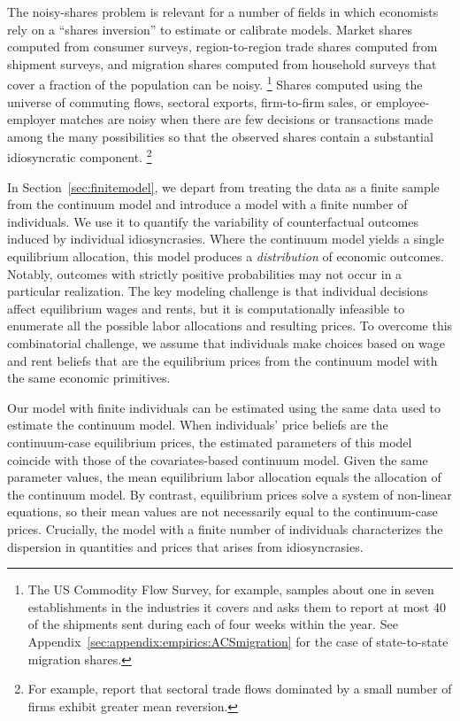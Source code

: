 \documentclass[11pt]{article}
\theoremstyle{definition}
\begin{document}
The noisy-shares problem is relevant for a number of fields 
in which economists rely on a ``shares inversion'' to estimate or calibrate models.
Market shares computed from consumer surveys,
region-to-region trade shares computed from shipment surveys,
and
migration shares computed from household surveys
that cover a fraction of the population
can be noisy.%
\footnote{
    The US Commodity Flow Survey, for example, samples about one in seven establishments in the industries it covers and asks them to report at most 40 of the shipments sent during each of four weeks within the year.
    See Appendix~\ref{sec:appendix:empirics:ACSmigration} for the case of state-to-state migration shares.
}
Shares computed using the 
universe of commuting flows, sectoral exports, firm-to-firm sales, or employee-employer matches
are noisy when there are few decisions or transactions made among the many possibilities so that the observed shares contain a substantial idiosyncratic component.%
\footnote{
    For example, \cite{GaubertItskhoki:2021} report that sectoral trade flows dominated by a small number of firms exhibit greater mean reversion.
}

In Section~\ref{sec:finitemodel}, we depart from treating the data as a finite sample from the continuum model and introduce a model with a finite number of individuals.
We use it to quantify the variability of counterfactual outcomes induced by individual idiosyncrasies.
Where the continuum model yields a single equilibrium allocation,
this model produces a \textit{distribution} of economic outcomes.
Notably, outcomes with strictly positive probabilities may not occur in a particular realization.
The key modeling challenge is that individual decisions affect equilibrium wages and rents, but it is computationally infeasible to enumerate all the possible labor allocations and resulting prices.
To overcome this combinatorial challenge,
we assume that individuals make choices based on wage and rent beliefs 
that are the equilibrium prices from the continuum model with the same economic primitives.

Our model with finite individuals can be estimated using the same data used to estimate the continuum model.
When individuals' price beliefs are the continuum-case equilibrium prices,
the estimated parameters of this model coincide with
those of the covariates-based continuum model.
Given the same parameter values, the mean equilibrium labor allocation equals the allocation of the continuum model.
By contrast, equilibrium prices solve a system of non-linear equations,
so their mean values are not necessarily equal to the continuum-case prices.
Crucially, the model with a finite number of individuals characterizes the dispersion in quantities and prices that arises from idiosyncrasies.
\end{document}
